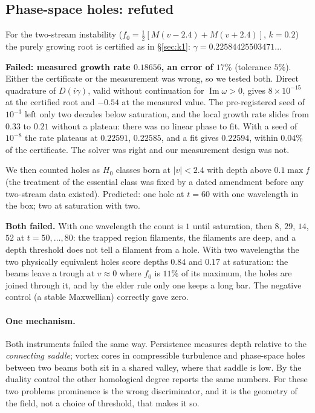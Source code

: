 \documentclass[11pt,a4paper]{article}
\begin{document}
\subsection{Phase-space holes: refuted}

For the two-stream instability ($f_0=\tfrac12[M(v-2.4)+M(v+2.4)]$, $k=0.2$) the purely growing root is
certified as in \S\ref{sec:k1}: $\gamma=0.22584425503471\ldots$

\begin{failbox}
\textbf{Failed: measured growth rate $0.18656$, an error of $17\%$} (tolerance $5\%$). Either the
certificate or the measurement was wrong, so we tested both. Direct quadrature of $D(i\gamma)$, valid
without continuation for $\operatorname{Im}\omega>0$, gives $8\times10^{-15}$ at the certified root and
$-0.54$ at the measured value. The pre-registered seed of $10^{-3}$ left only two decades below
saturation, and the local growth rate slides from $0.33$ to $0.21$ without a plateau: there was no
linear phase to fit. With a seed of $10^{-8}$ the rate plateaus at $0.22591$, $0.22585$, and a fit gives
$0.22594$, within $0.04\%$ of the certificate. The solver was right and our measurement design was not.
\end{failbox}

We then counted holes as $H_0$ classes born at $|v|<2.4$ with depth above $0.1\max f$ (the treatment of
the essential class was fixed by a dated amendment before any two-stream data existed). Predicted: one
hole at $t=60$ with one wavelength in the box; two at saturation with two.

\begin{failbox}
\textbf{Both failed.} With one wavelength the count is $1$ until saturation, then $8$, $29$, $14$, $52$
at $t=50,\ldots,80$: the trapped region filaments, the filaments are deep, and a depth threshold does not
tell a filament from a hole. With two wavelengths the two physically equivalent holes score depths
$0.84$ and $0.17$ at saturation: the beams leave a trough at $v\approx0$ where $f_0$ is $11\%$ of its
maximum, the holes are joined through it, and by the elder rule only one keeps a long bar. The negative
control (a stable Maxwellian) correctly gave zero.
\end{failbox}

\paragraph{One mechanism.} Both instruments failed the same way. Persistence measures depth relative to
the \emph{connecting saddle}; vortex cores in compressible turbulence and phase-space holes between two
beams both sit in a shared valley, where that saddle is low. By the duality control the other
homological degree reports the same numbers. For these two problems prominence is the wrong
discriminator, and it is the geometry of the field, not a choice of threshold, that makes it so.
\end{document}
